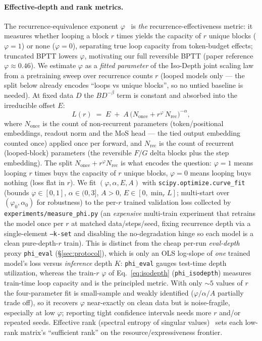 \documentclass[11pt]{article}
\newcommand{\code}[1]{\texttt{#1}}
\begin{document}
\paragraph{Effective-depth and rank metrics.}
The recurrence-equivalence exponent \(\varphi\)~\cite{isodepth} is \emph{the} recurrence-effectiveness
metric: it measures whether looping a block \(r\) times yields the capacity of \(r\) unique blocks
(\(\varphi{=}1\)) or none (\(\varphi{=}0\)), separating true loop capacity from token-budget effects;
truncated BPTT lowers \(\varphi\), motivating our full reversible BPTT (paper reference
\(\varphi\!\approx\!0.46\)).  We estimate \(\varphi\) as a \emph{fitted parameter} of the Iso-Depth
joint scaling law from a pretraining sweep over recurrence counts \(r\) (looped models only --- the
split below already encodes ``loops vs unique blocks'', so no untied baseline is needed).  At fixed
data \(D\) the \(B D^{-\beta}\) term is constant and absorbed into the irreducible offset \(E\):
\begin{equation}
L(r) \;=\; E \;+\; A\,\bigl(N_{\mathrm{once}} + r^{\varphi}\,N_{\mathrm{rec}}\bigr)^{-\alpha},
\label{eq:isodepth}
\end{equation}
where \(N_{\mathrm{once}}\) is the count of non-recurrent parameters (token/positional embeddings,
readout norm and the MoS head --- the tied output embedding counted once) applied once per forward,
and \(N_{\mathrm{rec}}\) is the count of recurrent (looped-block) parameters (the reversible \(F/G\)
delta blocks plus the step embedding).  The split \(N_{\mathrm{once}} + r^{\varphi} N_{\mathrm{rec}}\)
is what encodes the question: \(\varphi{=}1\) means looping \(r\) times buys the capacity of \(r\)
unique blocks, \(\varphi{=}0\) means looping buys nothing (loss flat in \(r\)).  We fit
\((\varphi,\alpha,E,A)\) with \texttt{scipy.optimize.curve\_fit} (bounds \(\varphi\!\in\![0,1]\),
\(\alpha\!\in\!(0,3]\), \(A>0\), \(E\!\in\![0,\min_r L]\); multi-start over \((\varphi_0,\alpha_0)\) for
robustness) to the per-\(r\) trained validation loss collected by \code{experiments/measure\_phi.py}
(an \emph{expensive} multi-train experiment that retrains the model once per \(r\) at matched
data/steps/seed, fixing recurrence depth via a single-element \code{--k-set} and disabling the
no-degradation hinge so each model is a clean pure-depth-\(r\) train).  This is distinct from the
cheap per-run \emph{eval-depth} proxy \code{phi\_eval} (\S\ref{sec:protocol}), which is only an OLS
log-slope of \emph{one} trained model's loss versus \emph{inference} depth \(K\): \code{phi\_eval}
gauges test-time depth utilization, whereas the train-\(r\) \(\varphi\) of Eq.~\eqref{eq:isodepth}
(\code{phi\_isodepth}) measures train-time loop capacity and is the principled metric.  With only
\(\sim\!5\) values of \(r\) the four-parameter fit is small-sample and weakly identified
(\(\varphi/\alpha/A\) partially trade off), so it recovers \(\varphi\) near-exactly on clean data but
is noise-fragile, especially at low \(\varphi\); reporting tight confidence intervals needs more \(r\)
and/or repeated seeds.  Effective rank (spectral entropy of singular values)~\cite{effrank} sets each
low-rank matrix's ``sufficient rank'' on the resource/expressiveness frontier.
\end{document}

